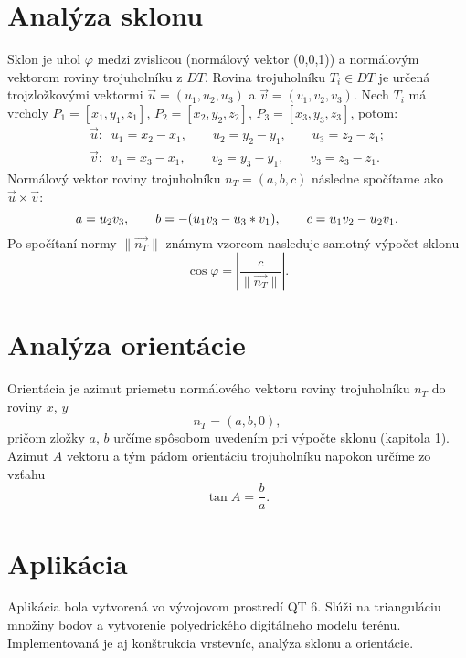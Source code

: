 \documentclass[11pt]{article}
\begin{document}
\section{Analýza sklonu}\label{sklon}
Sklon je uhol $\varphi$ medzi zvislicou (normálový vektor (0,0,1)) a normálovým vektorom roviny trojuholníku z $DT$. Rovina trojuholníku $T_i \in DT$ je určená trojzložkovými vektormi $\vec{u} = (u_1, u_2, u_3)$ a $\vec{v} = (v_1, v_2, v_3)$. Nech $T_i$ má vrcholy $P_1 = [x_1, y_1, z_1]$, $P_2 = [x_2, y_2, z_2]$, $P_3 = [x_3, y_3, z_3]$, potom:
\begin{equation*}
\begin{gathered}
\nonumber \vec{u} : \; \; u_1 = x_2-x_1, \quad \quad u_2 = y_2-y_1, \quad \quad u_3 = z_2-z_1;\\
\nonumber \vec{v} : \; \; v_1 = x_3-x_1, \quad \quad v_2 = y_3-y_1, \quad \quad v_3 = z_3-z_1.
\end{gathered}
\end{equation*}
Normálový vektor roviny trojuholníku $n_T = (a, b, c)$ následne spočítame ako $\vec{u} \times \vec{v}$:
\begin{equation*}
\nonumber a = u_2v_3, \quad \quad b = -(u_1v_3 - u_3*v_1), \quad \quad c = u_1v_2 - u_2v_1.\\
\end{equation*}
Po spočítaní normy $\lVert\vec{n_T}\rVert$ známym vzorcom nasleduje samotný výpočet sklonu
\begin{equation*}
\cos\varphi=\left|\frac{c}{\lVert\vec{n_T}\rVert}\right|.
\end{equation*}

\section{Analýza orientácie}
Orientácia je azimut priemetu normálového vektoru roviny trojuholníku $n_T$ do roviny $x$, $y$
\begin{equation*}
n_T=(a, b, 0),
\end{equation*}
pričom zložky $a$, $b$ určíme spôsobom uvedením pri výpočte sklonu (kapitola \ref{sklon}). Azimut $A$ vektoru a tým pádom orientáciu trojuholníku napokon určíme zo vzťahu
\begin{equation*}
\tan A = \frac{b}{a}.
\end{equation*}


\section{Aplikácia}
Aplikácia bola vytvorená vo vývojovom prostredí QT 6. Slúži na trianguláciu množiny bodov a vytvorenie polyedrického digitálneho modelu terénu. Implementovaná je aj konštrukcia vrstevníc, analýza sklonu a orientácie.
\end{document}
